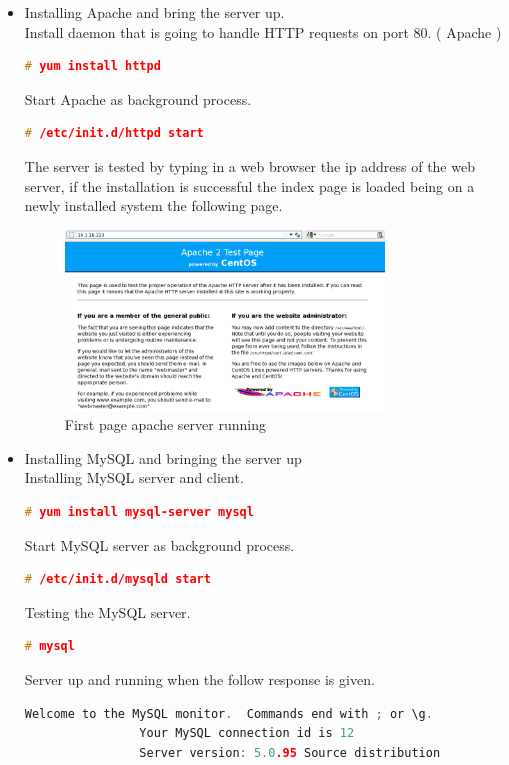 \begin{itemize}
		\item Installing Apache and bring the server up.\\
			Install daemon that is going to handle HTTP requests on port 80. ( Apache )
			\begin{lstlisting}[language=c, stepnumber=0, tabsize=1]
				# yum install httpd
			\end{lstlisting}
			Start Apache as background process.
			\begin{lstlisting}[language=c, stepnumber=0, tabsize=1]
				# /etc/init.d/httpd start
			\end{lstlisting}			
			The server is tested by typing in a web browser the ip address of the web server, if the installation is successful the index page is loaded being on a newly installed system the following page. 
			\begin{figure}[H]
				\begin{centering}
					\includegraphics[width=0.8\textwidth]{images/first_web.png}
					\caption{First page apache server running}
				\end{centering}
			\end{figure}
		\item Installing MySQL and bringing the server up\\
			Installing MySQL server and client.
			\begin{lstlisting}[language=c, stepnumber=0, tabsize=1]
				# yum install mysql-server mysql
			\end{lstlisting}
			Start MySQL server as background process.
			\begin{lstlisting}[language=c, stepnumber=0, tabsize=1]
				# /etc/init.d/mysqld start
			\end{lstlisting}
			Testing the MySQL server.
			\begin{lstlisting}[language=c, stepnumber=0, tabsize=1]
				# mysql
			\end{lstlisting}
			Server up and running when the follow response is given.
			\begin{lstlisting}[language=c, stepnumber=0, tabsize=1]
				Welcome to the MySQL monitor.  Commands end with ; or \g.
				Your MySQL connection id is 12
				Server version: 5.0.95 Source distribution


\end{lstlisting}
\end{itemize}

